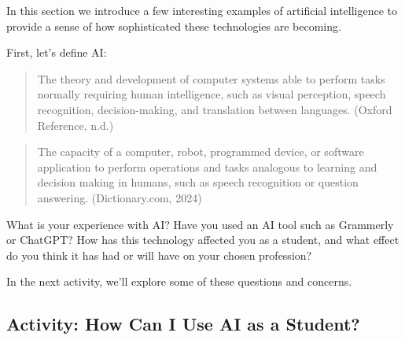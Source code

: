\documentclass[
  letterpaper,
  DIV=11,
  numbers=noendperiod]{scrreprt}
\begin{document}
In this section we introduce a few interesting examples of artificial
intelligence to provide a sense of how sophisticated these technologies
are becoming.

First, let's define AI:

\begin{quote}
The theory and development of computer systems able to perform tasks
normally requiring human intelligence, such as visual perception, speech
recognition, decision-making, and translation between languages. (Oxford
Reference, n.d.)
\end{quote}

\begin{quote}
The capacity of a computer, robot, programmed device, or software
application to perform operations and tasks analogous to learning and
decision making in humans, such as speech recognition or question
answering. (Dictionary.com, 2024)
\end{quote}

What is your experience with AI? Have you used an AI tool such as
Grammerly or ChatGPT? How has this technology affected you as a student,
and what effect do you think it has had or will have on your chosen
profession?

In the next activity, we'll explore some of these questions and
concerns.

\subsection{Activity: How Can I Use AI as a
Student?}\label{activity-how-can-i-use-ai-as-a-student}
\end{document}
